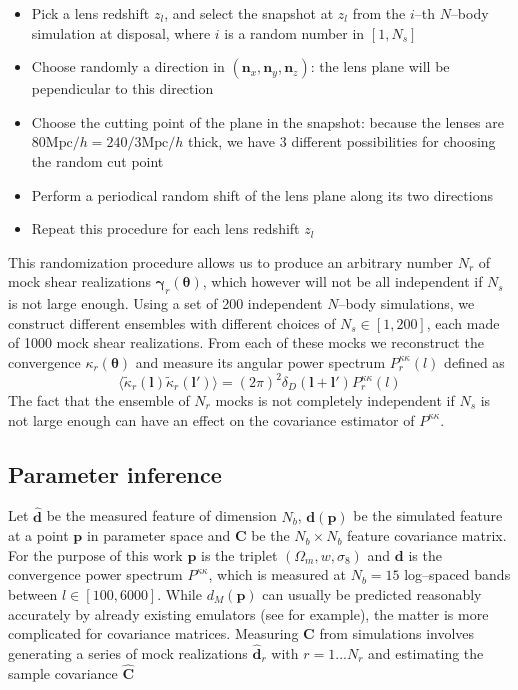 \documentclass[reprint,aps,prd,superscriptaddress,showkeys,showpacs]{revtex4-1}
\newcommand{\bb}[1]{\mathbf{#1}}
\newcommand{\bbh}[1]{\mathbf{\hat{#1}}}
\begin{document}
\begin{itemize}
\item Pick a lens redshift $z_l$, and select the snapshot at $z_l$ from the $i$--th $N$--body simulation at disposal, where $i$ is a random number in $[1,N_s]$
\item Choose randomly a direction in $(\bb{n}_x,\bb{n}_y,\bb{n}_z)$: the lens plane will be pependicular to this direction
\item Choose the cutting point of the plane in the snapshot: because the lenses are $80\mathrm{Mpc}/h=240/3\mathrm{Mpc}/h$ thick, we have 3 different possibilities for choosing the random cut point
\item Perform a periodical random shift of the lens plane along its two directions
\item Repeat this procedure for each lens redshift $z_l$  
\end{itemize}  
%
This randomization procedure allows us to produce an arbitrary number $N_r$ of mock shear realizations $\pmb{\gamma}_r(\pmb{\theta})$, which however will not be all independent if $N_s$ is not large enough. Using a set of 200 independent $N$--body simulations, we construct different ensembles with different choices of $N_s\in[1,200]$, each made of 1000 mock shear realizations. From each of these mocks we reconstruct the convergence $\kappa_r(\pmb{\theta})$ and measure its angular power spectrum $P^{\kappa\kappa}_r(l)$ defined as
\begin{equation}
\langle\tilde{\kappa}_r(\bb{l})\tilde{\kappa}_r(\bb{l}')\rangle = (2\pi)^2\delta_D(\bb{l}+\bb{l}')P^{\kappa\kappa}_r(l)
\end{equation}
%
The fact that the ensemble of $N_r$ mocks is not completely independent if $N_s$ is not large enough can have an effect on the covariance estimator of $P^{\kappa\kappa}$. 

\subsection{Parameter inference}
%
Let $\bbh{d}$ be the measured feature of dimension $N_b$, $\bb{d}(\bb{p})$ be the simulated feature at a point $\bb{p}$ in parameter space and $\bb{C}$ be the $N_b\times N_b$ feature covariance matrix. For the purpose of this work $\bb{p}$ is the triplet $(\Omega_m,w,\sigma_8)$ and $\bb{d}$ is the convergence power spectrum $P^{\kappa\kappa}$, which is measured at $N_b=15$ log--spaced bands between $l\in[100,6000]$. While $d_M(\bb{p})$ can usually be predicted reasonably accurately by already existing emulators (see \citep{coyote2,Nicaea} for example), the matter is more complicated for covariance matrices. Measuring $\bb{C}$ from simulations involves generating a series of mock realizations $\bbh{d}_r$ with $r=1...N_r$ and estimating the sample covariance $\bbh{C}$
\end{document}
